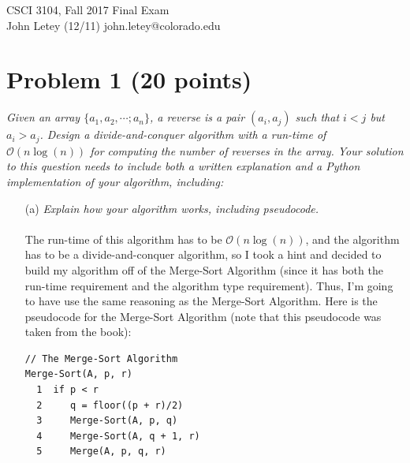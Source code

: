 \documentclass[12pt]{article}
\begin{document}
CSCI 3104, Fall 2017 \hfill Final Exam\\
John Letey (12/11) \hfill john.letey@colorado.edu\vspace{-11mm}

\hrulefill

{\selectfont\vspace{-8mm}
\section*{{\selectfont Problem 1 (20 points)}}\vspace{-10mm}
\textsl{Given an array $\{a_1, a_2, \cdots; a_n\}$, a reverse is a pair $(a_i, a_j)$ such that $i < j$ but $a_i > a_j$. Design a divide-and-conquer algorithm with a run-time of $\mathcal{O}(n\log(n))$ for computing the number of reverses in the array. Your solution to this question needs to include both a written explanation and a Python implementation of your algorithm, including:}
\begin{enumerate}
\item[(a)]\textsl{Explain how your algorithm works, including pseudocode.}\\ \\
The run-time of this algorithm has to be $\mathcal{O}(n\log(n))$, and the algorithm has to be a divide-and-conquer algorithm, so I took a hint and decided to build my algorithm off of the Merge-Sort Algorithm (since it has both the run-time requirement and the algorithm type requirement). Thus, I'm going to have use the same reasoning as the Merge-Sort Algorithm. Here is the pseudocode for the Merge-Sort Algorithm (note that this pseudocode was taken from the book):
\begin{verbatim}
// The Merge-Sort Algorithm
Merge-Sort(A, p, r)
  1  if p < r
  2     q = floor((p + r)/2)
  3     Merge-Sort(A, p, q)
  4     Merge-Sort(A, q + 1, r)
  5     Merge(A, p, q, r)
\end{verbatim}

\end{enumerate}}
\end{document}

